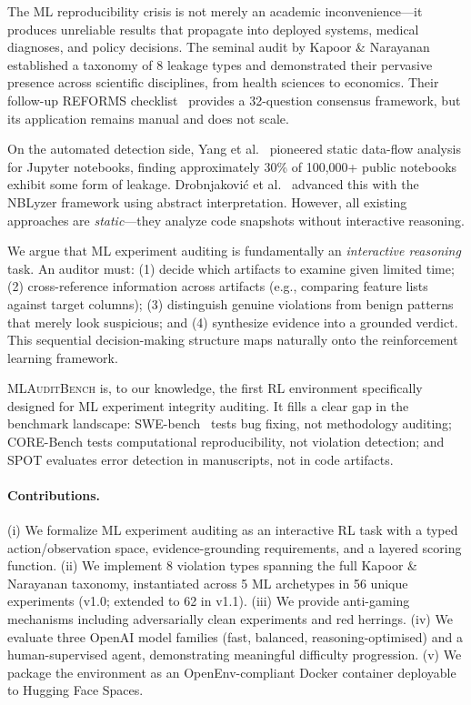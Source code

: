 \documentclass{article}
\begin{document}
The ML reproducibility crisis is not merely an academic inconvenience---it
produces unreliable results that propagate into deployed systems, medical
diagnoses, and policy decisions.  The seminal audit by Kapoor \&
Narayanan~\cite{kapoor2023leakage} established a taxonomy of 8 leakage
types and demonstrated their pervasive presence across scientific
disciplines, from health sciences to economics.  Their follow-up REFORMS
checklist~\cite{kapoor2024reforms} provides a 32-question consensus
framework, but its application remains manual and does not scale.

On the automated detection side, Yang et al.~\cite{yang2022data} pioneered
static data-flow analysis for Jupyter notebooks, finding approximately
30\% of 100,000+ public notebooks exhibit some form of leakage.
Drobnjakovi\'c et al.~\cite{drobnjakovic2024tase} advanced this with the
NBLyzer framework using abstract interpretation.  However, all existing
approaches are \emph{static}---they analyze code snapshots without
interactive reasoning.

We argue that ML experiment auditing is fundamentally an \emph{interactive
reasoning} task.  An auditor must: (1) decide which artifacts to examine
given limited time; (2) cross-reference information across artifacts (e.g.,
comparing feature lists against target columns); (3) distinguish genuine
violations from benign patterns that merely look suspicious; and (4)
synthesize evidence into a grounded verdict.  This sequential
decision-making structure maps naturally onto the reinforcement learning
framework.

\textsc{MLAuditBench} is, to our knowledge, the first RL environment
specifically designed for ML experiment integrity auditing.  It fills a
clear gap in the benchmark landscape: SWE-bench~\cite{jimenez2024swebench}
tests bug fixing, not methodology auditing; CORE-Bench tests computational
reproducibility, not violation detection; and SPOT evaluates error
detection in manuscripts, not in code artifacts.

\paragraph{Contributions.}
(i) We formalize ML experiment auditing as an interactive RL task with a
typed action/observation space, evidence-grounding requirements, and a
layered scoring function.
(ii) We implement 8 violation types spanning the full Kapoor \& Narayanan
taxonomy, instantiated across 5 ML archetypes in 56 unique experiments (v1.0; extended to 62 in v1.1).
(iii) We provide anti-gaming mechanisms including adversarially clean
experiments and red herrings.
(iv) We evaluate three OpenAI model families (fast, balanced, reasoning-optimised) and a human-supervised agent, demonstrating meaningful difficulty progression.
(v) We package the environment as an OpenEnv-compliant Docker container
deployable to Hugging Face Spaces.
\end{document}
